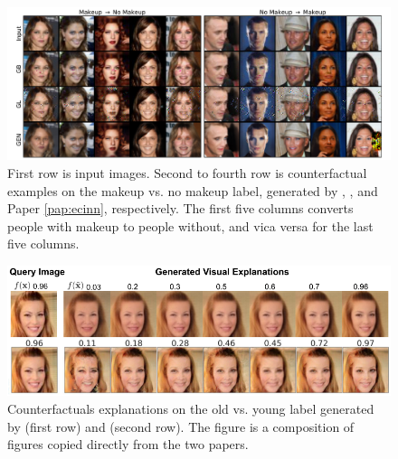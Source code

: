 \documentclass[11pt,a4paper,twoside,openright,final]{memoir}
\newcommand*{\paperref}[1]{Paper \hyperref[#1]{\ref{#1}}}
\begin{document}
\begin{figure}
    \centering
    \includegraphics[trim={67, 10, 0, 0}, clip, width=\textwidth]{graphics/celeba.pdf} 
    \caption{First row is input images. Second to fourth row is counterfactual examples on the makeup vs. no makeup label, generated by \cite{Wachter2017}, \cite{VanLooveren2019}, and \paperref{pap:ecinn}, respectively. The first five columns converts people with makeup to people without, and vica versa for the last five columns.}
    \label{fig:iterative-counterfactuals-copied}
\end{figure}
\begin{figure}[b]
    \centering
    \includegraphics[width=\linewidth]{graphics/generative.png}
    \caption{Counterfactuals explanations on the old vs. young label generated by \cite{Rodriguez2021} (first row) and \cite{Singla2019} (second row). The figure is a composition of figures copied directly from the two papers.} 
    \label{fig:generative-counterfactuals-copied}
\end{figure}
\end{document}
